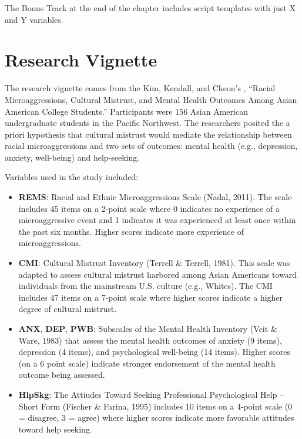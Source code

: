 \documentclass[
  11pt,
]{book}
\providecommand{\tightlist}{%
  \setlength{\itemsep}{0pt}\setlength{\parskip}{0pt}}
\begin{document}
The Bonus Track at the end of the chapter includes script templates with just X and Y variables.

\hypertarget{research-vignette-6}{%
\section{Research Vignette}\label{research-vignette-6}}

The research vignette comes from the Kim, Kendall, and Cheon's \citeyearpar{kim_racial_2017}, ``Racial Microaggressions, Cultural Mistrust, and Mental Health Outcomes Among Asian American College Students.'' Participants were 156 Asian American undergraduate students in the Pacific Northwest. The researchers posited the a priori hypothesis that cultural mistrust would mediate the relationship between racial microaggressions and two sets of outcomes: mental health (e.g., depression, anxiety, well-being) and help-seeking.

Variables used in the study included:

\begin{itemize}
\tightlist
\item
  \textbf{REMS}: Racial and Ethnic Microaggressions Scale (Nadal, 2011). The scale includes 45 items on a 2-point scale where 0 indicates no experience of a microaggressive event and 1 indicates it was experienced at least once within the past six months. Higher scores indicate more experience of microaggressions.
\item
  \textbf{CMI}: Cultural Mistrust Inventory (Terrell \& Terrell, 1981). This scale was adapted to assess cultural mistrust harbored among Asian Americans toward individuals from the mainstream U.S. culture (e.g., Whites). The CMI includes 47 items on a 7-point scale where higher scores indicate a higher degree of cultural mistrust.
\item
  \textbf{ANX}, \textbf{DEP}, \textbf{PWB}: Subscales of the Mental Health Inventory (Veit \& Ware, 1983) that assess the mental health outcomes of anxiety (9 items), depression (4 items), and psychological well-being (14 items). Higher scores (on a 6 point scale) indicate stronger endorsement of the mental health outcome being assessed.
\item
  \textbf{HlpSkg}: The Attiudes Toward Seeking Professional Psychological Help -- Short Form (Fischer \& Farina, 1995) includes 10 items on a 4-point scale (0 = disagree, 3 = agree) where higher scores indicate more favorable attitudes toward help seeking.
\end{itemize}
\end{document}
